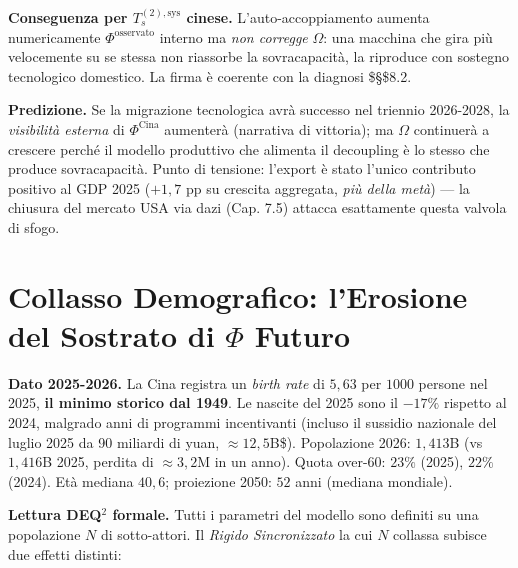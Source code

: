 \Proved{} \textbf{Conseguenza per \(T_s^{(2),\text{sys}}\) cinese.}
L'auto-accoppiamento aumenta numericamente \(\Phi^{\text{osservato}}\)
interno ma \emph{non corregge} \(\Omega\): una macchina che gira più
velocemente su se stessa non riassorbe la sovracapacità, la riproduce
con sostegno tecnologico domestico. La firma è coerente con la diagnosi
\$\S\$8.2.

\Conj{} \textbf{Predizione.} Se la migrazione tecnologica avrà successo
nel triennio 2026-2028, la \emph{visibilità esterna} di
\(\Phi^{\text{Cina}}\) aumenterà (narrativa di vittoria); ma \(\Omega\)
continuerà a crescere perché il modello produttivo che alimenta il
decoupling è lo stesso che produce sovracapacità. Punto di tensione:
l'export è stato l'unico contributo positivo al GDP 2025 (\(+1{,}7\) pp
su crescita aggregata, \emph{più della metà}) --- la chiusura del
mercato USA via dazi (Cap. 7.5) attacca esattamente questa valvola di
sfogo.



\section{\texorpdfstring{Collasso Demografico: l'Erosione del Sostrato
di \(\Phi\)
Futuro}{Collasso Demografico: l'Erosione del Sostrato di \textbackslash Phi Futuro}}\label{collasso-demografico-lerosione-del-sostrato-di-phi-futuro}

\Proved{} \textbf{Dato 2025-2026.} La Cina registra un \emph{birth rate}
di \(5{,}63\) per \(1000\) persone nel 2025, \textbf{il minimo storico
dal 1949}. Le nascite del 2025 sono il \(-17\%\) rispetto al 2024,
malgrado anni di programmi incentivanti (incluso il sussidio nazionale
del luglio 2025 da 90 miliardi di yuan, \(\approx 12{,}5\)B\$).
Popolazione 2026: \(1{,}413\)B (vs \(1{,}416\)B 2025, perdita di
\(\approx 3{,}2\)M in un anno). Quota over-60: \(23\%\) (2025), \(22\%\)
(2024). Età mediana \(40{,}6\); proiezione 2050: \(52\) anni (mediana
mondiale).

\Hypoth{} \textbf{Lettura DEQ$^2$ formale.} Tutti i parametri del modello
sono definiti su una popolazione \(N\) di sotto-attori. Il \emph{Rigido
Sincronizzato} la cui \(N\) collassa subisce due effetti distinti:


